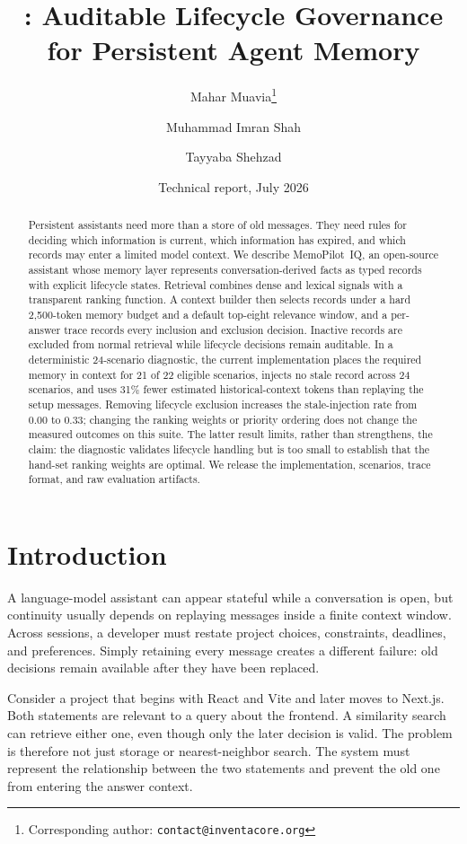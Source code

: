 \documentclass[11pt]{article}
\title{\textbf{\sysname{}: Auditable Lifecycle Governance\\
for Persistent Agent Memory}}
\author[1]{Mahar Muavia\thanks{Corresponding author: \texttt{contact@inventacore.org}}}
\author[1]{Muhammad Imran Shah}
\author[1]{Tayyaba Shehzad}
\affil[1]{InventaCore AI \quad \url{https://inventacore.org}}
\date{Technical report, July 2026}
\newcommand{\sysname}{MemoPilot~IQ}
\begin{document}
\maketitle

\begin{abstract}
Persistent assistants need more than a store of old messages. They need rules
for deciding which information is current, which information has expired, and
which records may enter a limited model context. We describe \sysname{}, an
open-source assistant whose memory layer represents conversation-derived facts
as typed records with explicit lifecycle states. Retrieval combines dense and
lexical signals with a transparent ranking function. A context builder then
selects records under a hard 2,500-token memory budget and a default top-eight
relevance window, and a per-answer trace records every inclusion and exclusion
decision. Inactive records are excluded from normal retrieval while lifecycle
decisions remain auditable. In a deterministic 24-scenario diagnostic, the
current implementation places the required memory in context for 21 of 22
eligible scenarios, injects no stale record across 24 scenarios, and uses 31\%
fewer estimated historical-context tokens than replaying the setup messages.
Removing lifecycle exclusion increases the stale-injection rate from 0.00 to
0.33; changing the ranking weights or priority ordering does not change the
measured outcomes on this suite. The latter result limits, rather than
strengthens, the claim: the diagnostic validates lifecycle handling but is too
small to establish that the hand-set ranking weights are optimal. We release
the implementation, scenarios, trace format, and raw evaluation artifacts.
\end{abstract}

\section{Introduction}
\label{sec:intro}

A language-model assistant can appear stateful while a conversation is open,
but continuity usually depends on replaying messages inside a finite context
window. Across sessions, a developer must restate project choices, constraints,
deadlines, and preferences. Simply retaining every message creates a different
failure: old decisions remain available after they have been replaced.

Consider a project that begins with React and Vite and later moves to Next.js.
Both statements are relevant to a query about the frontend. A similarity search
can retrieve either one, even though only the later decision is valid. The
problem is therefore not just storage or nearest-neighbor search. The system
must represent the relationship between the two statements and prevent the old
one from entering the answer context.
\end{document}

